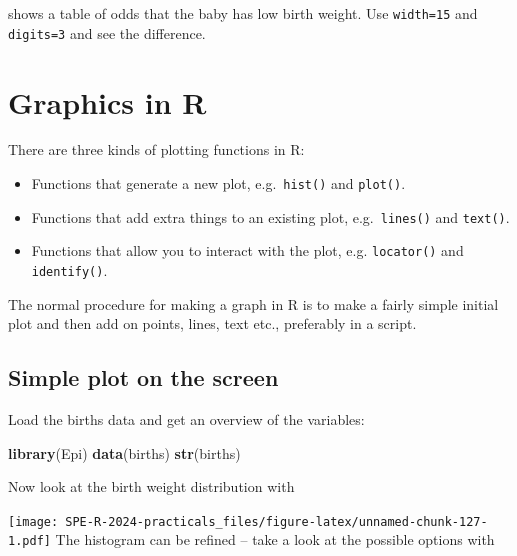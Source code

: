 \documentclass[
]{book}
\newenvironment{Shaded}{\begin{snugshade}}{\end{snugshade}}
\newcommand{\FunctionTok}[1]{\textcolor[rgb]{0.13,0.29,0.53}{\textbf{#1}}}
\newcommand{\NormalTok}[1]{#1}
\newcommand{\SpecialCharTok}[1]{\textcolor[rgb]{0.81,0.36,0.00}{\textbf{#1}}}
\providecommand{\tightlist}{%
  \setlength{\itemsep}{0pt}\setlength{\parskip}{0pt}}
\begin{document}
shows a table of odds that the baby has low birth weight. Use
\texttt{width=15} and \texttt{digits=3} and see the difference.

\chapter{Graphics in R}\label{graphics-in-r}

There are three kinds of plotting functions in R:

\begin{itemize}
\tightlist
\item
  Functions that generate a new plot, e.g.~\texttt{hist()} and
  \texttt{plot()}.
\item
  Functions that add extra things to an existing plot,
  e.g.~\texttt{lines()} and \texttt{text()}.
\item
  Functions that allow you to interact with the plot, e.g.
  \texttt{locator()} and \texttt{identify()}.
\end{itemize}

The normal procedure for making a graph in R is to make a fairly
simple initial plot and then add on points, lines, text etc.,
preferably in a script.

\section{Simple plot on the screen}\label{simple-plot-on-the-screen}

Load the births data and get an overview of the variables:

\begin{Shaded}
\begin{Highlighting}[]
\FunctionTok{library}\NormalTok{(Epi)}
\FunctionTok{data}\NormalTok{(births)}
\FunctionTok{str}\NormalTok{(births)}
\end{Highlighting}
\end{Shaded}

Now look at the birth weight distribution with

\begin{Shaded}
\end{Shaded}

\texttt{[image: SPE-R-2024-practicals\_files/figure-latex/unnamed-chunk-127-1.pdf]}
The histogram can be refined -- take a look at the possible options with
\end{document}

